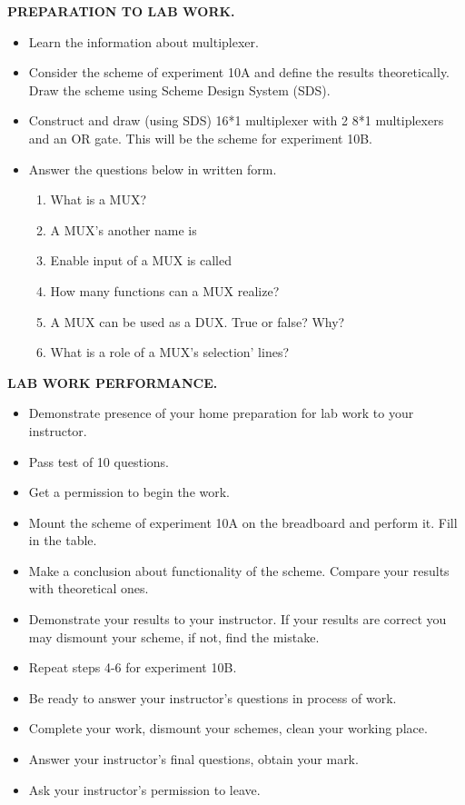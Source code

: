\documentclass[a4paper]{article}
\begin{document}
    \textbf{PREPARATION TO LAB WORK.}
    \begin{itemize}
        \item Learn the information about multiplexer.
        \item Consider the scheme of experiment 10A and define the results theoretically. Draw the scheme using Scheme Design System (SDS).
        \item Construct and draw (using SDS) 16*1 multiplexer with 2 8*1 multiplexers and an OR gate. This will be the scheme for experiment 10B.
        \item Answer the questions below in written form.
        \begin{enumerate}
            \item What is a MUX?
            \item A MUX's another name is
            \item Enable input of a MUX is called
            \item How many functions can a MUX realize?
            \item A MUX can be used as a DUX. True or false? Why?
            \item What is a role of a MUX's selection' lines?
        \end{enumerate}
    \end{itemize}
    
    \textbf{LAB WORK PERFORMANCE.}
    \begin{itemize}
        \item Demonstrate presence of your home preparation for lab work to your instructor.
        \item Pass test of 10 questions.
        \item Get a permission to begin the work.
        \item Mount the scheme of experiment 10A on the breadboard and perform it. Fill in the table.
        \item Make a conclusion about functionality of the scheme. Compare your results with theoretical ones.
        \item Demonstrate your results to your instructor. If your results are correct you may dismount your scheme, if not, find the mistake.
        \item Repeat steps 4-6 for experiment 10B.
        \item Be ready to answer your instructor's questions in process of work.
        \item Complete your work, dismount your schemes, clean your working place.
        \item Answer your instructor's final questions, obtain your mark.
        \item Ask your instructor's permission to leave.
    \end{itemize}
    
\end{document}
